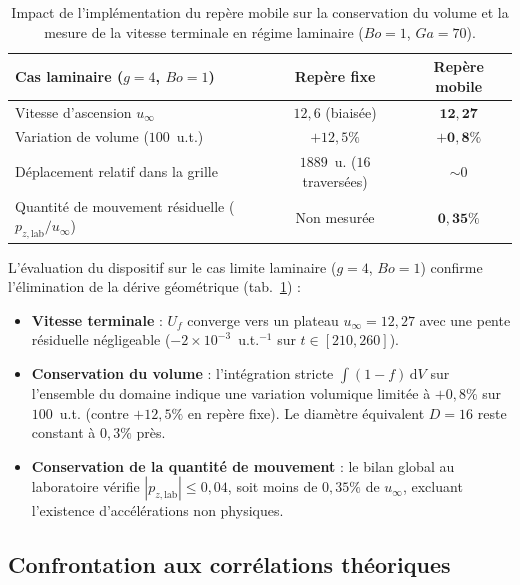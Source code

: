 \begin{table}[htbp]
    \centering
    \small
    \renewcommand{\arraystretch}{1.2}
    \begin{tabular}{lcc}
        \toprule
        Cas laminaire ($g=4$, $Bo=1$) & Repère fixe & \textbf{Repère mobile} \\
        \midrule
        Vitesse d'ascension $u_\infty$ & $12{,}6$ (biaisée) & $\mathbf{12{,}27}$ \\
        Variation de volume ($100$~u.t.) & $+12{,}5\%$ & $\mathbf{+0{,}8\%}$ \\
        Déplacement relatif dans la grille & $1889$~u. ($16$ traversées) & $\sim 0$ \\
        Quantité de mouvement résiduelle ($p_{z,\text{lab}}/u_\infty$) & Non mesurée & $\mathbf{0{,}35\%}$ \\
        \bottomrule
    \end{tabular}
    \caption{Impact de l'implémentation du repère mobile sur la conservation du volume et la mesure de la vitesse terminale en régime laminaire ($Bo=1$, $Ga=70$).}
    \label{tab:frame_verdict}
\end{table}

L'évaluation du dispositif sur le cas limite laminaire ($g=4$, $Bo=1$) confirme l'élimination de la dérive géométrique (tab.~\ref{tab:frame_verdict}) :
\begin{itemize}
    \item \textbf{Vitesse terminale} : $U_f$ converge vers un plateau $u_\infty = 12{,}27$ avec une pente résiduelle négligeable ($-2\times10^{-3}$~u.t.$^{-1}$ sur $t \in [210,260]$).
    \item \textbf{Conservation du volume} : l'intégration stricte $\int(1-f)\,\mathrm{d}V$ sur l'ensemble du domaine indique une variation volumique limitée à $+0{,}8\%$ sur $100$~u.t. (contre $+12{,}5\%$ en repère fixe). Le diamètre équivalent $D=16$ reste constant à $0{,}3\%$ près.
    \item \textbf{Conservation de la quantité de mouvement} : le bilan global au laboratoire vérifie $|p_{z,\text{lab}}| \le 0{,}04$, soit moins de $0{,}35\%$ de $u_\infty$, excluant l'existence d'accélérations non physiques.
\end{itemize}

\subsection{Confrontation aux corrélations théoriques}
\label{subsec:theorie}


